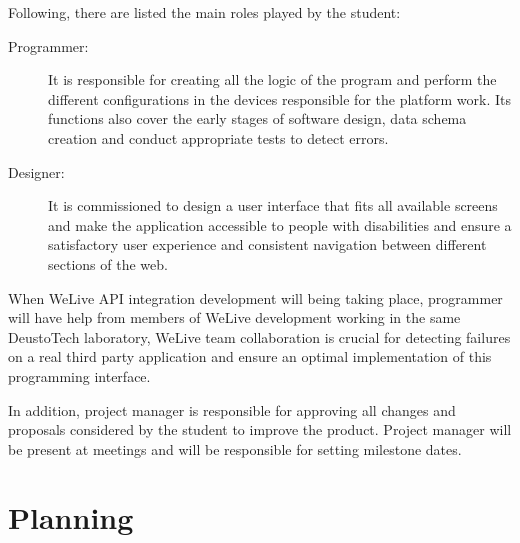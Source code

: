 \documentclass{DeustoFDP}
\begin{document}
Following, there are listed the main roles played by the student:

\begin{description}
	\item[Programmer:] It is responsible for creating all the logic of the program and perform the different configurations in the devices responsible for the platform work. Its functions also cover the early stages of software design, data schema creation and conduct appropriate tests to detect errors.
	
	\item[Designer:] It is commissioned to design a user interface that fits all available screens and make the application accessible to people with disabilities and ensure a satisfactory user experience and consistent navigation between different sections of the web.
\end{description}

When WeLive API integration development will being taking place, programmer will have help from members of WeLive development working in the same DeustoTech laboratory, WeLive team collaboration is crucial for detecting failures on a real third party application and ensure an optimal implementation of this programming interface.

In addition, project manager is responsible for approving all changes and proposals considered by the student to improve the product. Project manager will be present at meetings and will be responsible for setting milestone dates.

\chapter{Planning}\label{cha:planning}
\end{document}
